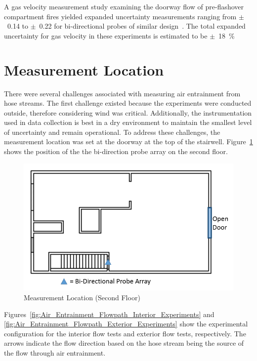 \documentclass[12pt,oneside]{book}
\begin{document}
A gas velocity measurement study examining the doorway flow of pre-flashover compartment fires yielded expanded uncertainty measurements ranging from $\pm$~0.14 to $\pm$~0.22 for bi-directional probes of similar design~\cite{Bryant:FSJ2009}. The total expanded uncertainty for gas velocity in these experiments is estimated to be $\pm$~18~\%

\section{Measurement Location}
\label{sec:location}
There were several challenges associated with measuring air entrainment from hose streams. The first challenge existed because the experiments were conducted outside, therefore considering wind was critical. Additionally, the instrumentation used in data collection is best in a dry environment to maintain the smallest level of uncertainty and remain operational. To address these challenges, the measurement location was set at the doorway at the top of the stairwell. Figure~\ref{fig:Measurement_Location_Second_Floor} shows the position of the the bi-direction probe array on the second floor.

\begin{figure}[!ht]
	\centering
	\includegraphics[width=.7\columnwidth]{Figures/Air_Entrainment/Measurement_Locations_Secondfloor}
	\caption{Measurement Location (Second Floor)}
	\label{fig:Measurement_Location_Second_Floor}
\end{figure}

Figures~\ref{fig:Air_Entrainment_Flowpath_Interior_Experiments} and \ref{fig:Air_Entrainment_Flowpath_Exterior_Experiments} show the experimental configuration for the interior flow tests and exterior flow tests, respectively. The arrows indicate the flow direction based on the hose stream being the source of the flow through air entrainment.
\end{document}
